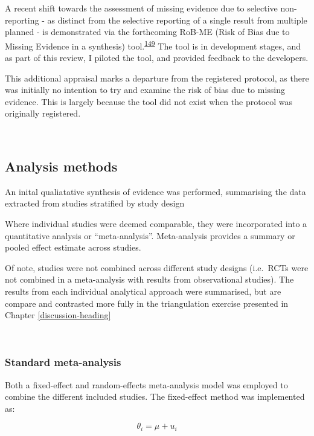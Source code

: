 \documentclass[a4paper, twoside]{templates/ociamthesis}
\begin{document}
A recent shift towards the assessment of missing evidence due to selective non-reporting - as distinct from the selective reporting of a single result from multiple planned - is demonstrated via the forthcoming RoB-ME (Risk of Bias due to Missing Evidence in a synthesis) tool.\textsuperscript{\protect\hyperlink{ref-zotero-15123}{149}} The tool is in development stages, and as part of this review, I piloted the tool, and provided feedback to the developers.

This additional appraisal marks a departure from the registered protocol, as there was initially no intention to try and examine the risk of bias due to missing evidence. This is largely because the tool did not exist when the protocol was originally registered.

~

\hypertarget{analysis-methods}{%
\subsection{Analysis methods}\label{analysis-methods}}

An inital qualiatative synthesis of evidence was performed, summarising the data extracted from studies stratified by study design

Where individual studies were deemed comparable, they were incorporated into a quantitative analysis or ``meta-analysis''. Meta-analysis provides a summary or pooled effect estimate across studies.

Of note, studies were not combined across different study designs (i.e.~RCTs were not combined in a meta-analysis with results from observational studies). The results from each individual analytical approach were summarised, but are compare and contrasted more fully in the triangulation exercise presented in Chapter \ref{discussion-heading}

~

\hypertarget{standard-meta-analysis}{%
\subsubsection{Standard meta-analysis}\label{standard-meta-analysis}}

Both a fixed-effect and random-effects meta-analysis model was employed to combine the different included studies. The fixed-effect method was implemented as:

\begin{equation}
  \theta_i = \mu + u_i
  \label{eq:meta-analysis-random}
\end{equation}
\end{document}

